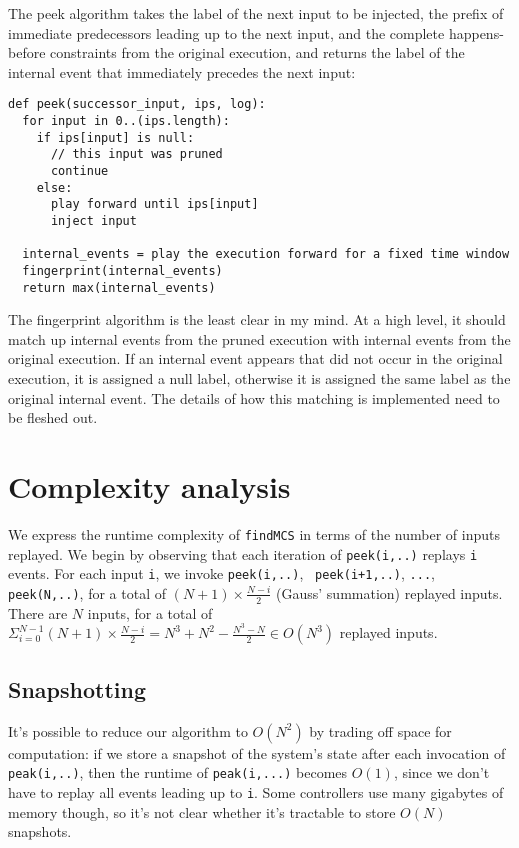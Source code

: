 \documentclass[10pt,a4paper,titlepage]{article}
\begin{document}
The peek algorithm takes the label of the next input to be injected, the prefix of
immediate predecessors leading up to the next input, and the complete
happens-before constraints from the original execution, and returns the label
of the internal event that immediately precedes the next input:

\begin{verbatim}
def peek(successor_input, ips, log):
  for input in 0..(ips.length):
    if ips[input] is null:
      // this input was pruned
      continue
    else:
      play forward until ips[input]
      inject input 

  internal_events = play the execution forward for a fixed time window
  fingerprint(internal_events)
  return max(internal_events)
\end{verbatim}

The fingerprint algorithm is the least clear in my mind. At a high level, it
should match up internal events from the pruned execution with internal events
from the original execution. If an internal event appears that did not occur
in the original execution, it is assigned a null label, otherwise it is
assigned the same label as the original internal event. The details of how
this matching is implemented need to be fleshed out.

\section*{Complexity analysis}

We express the runtime complexity of {\tt findMCS} in terms of the number of
inputs replayed. We begin by observing that each iteration of {\tt peek(i,..)}
replays {\tt i}
events. For each input {\tt i}, we invoke {\tt peek(i,..)}, {\tt
peek(i+1,..)}, {\tt ...}, {\tt peek(N,..)}, for a total of $(N+1) \times
\frac{N-i}{2}$
(Gauss' summation) replayed inputs. 
There are $N$ inputs, for a total of 
$\Sigma_{i=0}^{N-1} (N+1) \times \frac{N-i}{2} = N^3 + N^2 - \frac{N^3 - N}{2}
\in O(N^3)$
replayed inputs.

\subsection*{Snapshotting}

It's possible to reduce our algorithm to $O(N^2)$ by trading off space
for computation: if we store a snapshot of the system's state after each
invocation of {\tt peak(i,..)}, then the runtime of {\tt peak(i,...)} becomes
$O(1)$, since we don't have to replay all events leading up to {\tt i}. 
Some controllers use many gigabytes of memory though, so it's not clear
whether it's tractable to store $O(N)$ snapshots.
\end{document}
